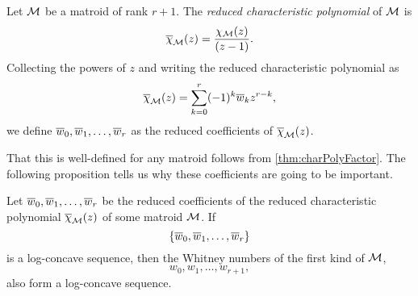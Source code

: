 \documentclass[12pt,oneside]{../../sfsuthesis}
\begin{document}
\begin{definition}\label{def:reducedCharPoly}
    Let \( \mathcal{M} \) be a matroid of rank \( r + 1 \).
    The \emph{reduced characteristic polynomial} of \( \mathcal{M} \) is
    \[
        \overline{\chi}_{\mathcal{M}}(z) = \frac{\chi_{\mathcal{M}}(z)}{(z-1)}.
    \]
    Collecting the powers of \( z \) and writing the reduced characteristic polynomial as
    \[
        \overline{\chi}_{\mathcal{M}}(z) = \sum_{k=0}^r (-1)^k\overline{w}_k z^{r-k},
    \]
    we define \( \overline{w}_0, \overline{w}_1, \dots, \overline{w}_r \) as the reduced coefficients of \( \overline{\chi}_{\mathcal{M}}(z) \).
\end{definition}
That this is well-defined for any matroid follows from \th\ref{thm:charPolyFactor}.
The following proposition tells us why these coefficients are going to be important.
\begin{lemma}\th\label{thm:reducedImpliesOriginal}
    Let  \( \overline{w}_0, \overline{w}_1, \dots, \overline{w}_r \) be the reduced coefficients of the reduced characteristic polynomial \( \overline{\chi}_{\mathcal{M}}(z) \) of some matroid \( \mathcal{M} \).
    If
    \[
        \{\overline{w}_0, \overline{w}_1, \dots, \overline{w}_r \}
    \]
    is a log-concave sequence, then the Whitney numbers of the first kind of \( \mathcal{M} \),
    \[
        w_0, w_1, \dots, w_{r+1},
    \]
    also form a log-concave sequence.
\end{lemma}
\end{document}
